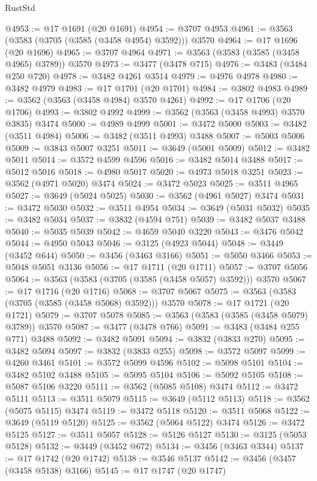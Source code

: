 \begin{lexlean}{RustStd}
\begin{coremodule}
{\begin{coremodule}
{{{{{{{{{{{{{{{{{{{{{{{{{{{{{{{{{{{{{{{{{{{{{@4953 := @17 @1691 (@20 @1691)
@4954 := @3707 @4953
@4961 := @3563 (@3583 (@3705 (@3585 (@3458 @4954) @3592))) @3570
@4964 := @17 @1696 (@20 @1696)
@4965 := @3707 @4964
@4971 := @3563 (@3583 (@3585 (@3458 @4965) @3789)) @3570
@4973 := @3477 (@3478 @715)
@4976 := @3483 (@3484 @250 @720)
@4978 := @3482 @4261 @3514
@4979 := @4976 @4978
@4980 := @3482 @4979
@4983 := @17 @1701 (@20 @1701)
@4984 := @3802 @4983
@4989 := @3562 (@3563 (@3458 @4984) @3570 @4261)
@4992 := @17 @1706 (@20 @1706)
@4993 := @3802 @4992
@4999 := @3562 (@3563 (@3458 @4993) @3570 @3835) @3474
@5000 := @4989 @4999
@5001 := @3472 @5000
@5003 := @3482 (@3511 @4984)
@5006 := @3482 (@3511 @4993) @3488
@5007 := @5003 @5006
@5009 := @3843 @5007 @3251
@5011 := @3649 (@5001 @5009)
@5012 := @3482 @5011
@5014 := @3572 @4599 @4596
@5016 := @3482 @5014 @3488
@5017 := @5012 @5016
@5018 := @4980 @5017
@5020 := @4973 @5018 @3251
@5023 := @3562 (@4971 @5020) @3474
@5024 := @3472 @5023
@5025 := @3511 @4965
@5027 := @3649 (@5024 @5025)
@5030 := @3562 (@4961 @5027) @3474
@5031 := @3472 @5030
@5032 := @3511 @4954
@5034 := @3649 (@5031 @5032)
@5035 := @3482 @5034
@5037 := @3832 (@4594 @751)
@5039 := @3482 @5037 @3488
@5040 := @5035 @5039
@5042 := @4659 @5040 @3220
@5043 := @3476 @5042
@5044 := @4950 @5043
@5046 := @3125 (@4923 @5044)
@5048 := @3449 (@3452 @644)
@5050 := @3456 (@3463 @3166)
@5051 := @5050 @3466
@5053 := @5048 @5051 @3136
@5056 := @17 @1711 (@20 @1711)
@5057 := @3707 @5056
@5064 := @3563 (@3583 (@3705 (@3585 (@3458 @5057) @3592))) @3570
@5067 := @17 @1716 (@20 @1716)
@5068 := @3707 @5067
@5075 := @3563 (@3583 (@3705 (@3585 (@3458 @5068) @3592))) @3570
@5078 := @17 @1721 (@20 @1721)
@5079 := @3707 @5078
@5085 := @3563 (@3583 (@3585 (@3458 @5079) @3789)) @3570
@5087 := @3477 (@3478 @766)
@5091 := @3483 (@3484 @255 @771) @3488
@5092 := @3482 @5091
@5094 := @3832 (@3833 @270)
@5095 := @3482 @5094
@5097 := @3832 (@3833 @255)
@5098 := @3572 @5097
@5099 := @4260 @3461
@5101 := @3572 @5099 @4596
@5102 := @5098 @5101
@5104 := @3482 @5102 @3488
@5105 := @5095 @5104
@5106 := @5092 @5105
@5108 := @5087 @5106 @3220
@5111 := @3562 (@5085 @5108) @3474
@5112 := @3472 @5111
@5113 := @3511 @5079
@5115 := @3649 (@5112 @5113)
@5118 := @3562 (@5075 @5115) @3474
@5119 := @3472 @5118
@5120 := @3511 @5068
@5122 := @3649 (@5119 @5120)
@5125 := @3562 (@5064 @5122) @3474
@5126 := @3472 @5125
@5127 := @3511 @5057
@5128 := @5126 @5127
@5130 := @3125 (@5053 @5128)
@5132 := @3449 (@3452 @672)
@5134 := @3456 (@3463 @3344)
@5137 := @17 @1742 (@20 @1742)
@5138 := @3546 @5137
@5142 := @3456 (@3457 (@3458 @5138) @3166)
@5145 := @17 @1747 (@20 @1747)
}}}}}}}}}}}}}}}}}}}}}}}}}}}}}}}}}}}}}}}}}}}}}
\end{coremodule}}
\end{coremodule}
\end{lexlean}
